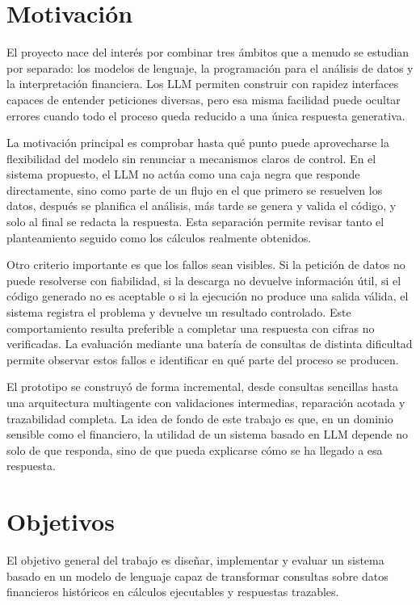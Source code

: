 \section{Motivaci\'on}

El proyecto nace del inter\'es por combinar tres \'ambitos que a menudo se estudian por separado: los modelos de lenguaje, la programaci\'on para el an\'alisis de datos y la
interpretaci\'on financiera. Los LLM permiten construir con rapidez interfaces capaces de entender peticiones diversas, pero esa misma facilidad puede ocultar errores
cuando todo el proceso queda reducido a una \'unica respuesta generativa.

La motivaci\'on principal es comprobar hasta qu\'e punto puede aprovecharse la flexibilidad del modelo sin renunciar a mecanismos claros de control. En el sistema propuesto,
el LLM no act\'ua como una caja negra que responde directamente, sino como parte de un flujo en el que primero se resuelven los datos, despu\'es se planifica el an\'alisis,
m\'as tarde se genera y valida el c\'odigo, y solo al final se redacta la respuesta. Esta separaci\'on permite revisar tanto el planteamiento seguido como los c\'alculos
realmente obtenidos.

Otro criterio importante es que los fallos sean visibles. Si la petici\'on de datos no puede resolverse con fiabilidad, si la descarga no devuelve informaci\'on \'util, si
el c\'odigo generado no es aceptable o si la ejecuci\'on no produce una salida v\'alida, el sistema registra el problema y devuelve un resultado controlado. Este
comportamiento resulta preferible a completar una respuesta con cifras no verificadas. La evaluaci\'on mediante una bater\'ia de consultas de distinta dificultad permite
observar estos fallos e identificar en qu\'e parte del proceso se producen.

El prototipo se construy\'o de forma incremental, desde consultas sencillas hasta una arquitectura multiagente con validaciones intermedias, reparaci\'on acotada y
trazabilidad completa. La idea de fondo de este trabajo es que, en un dominio sensible como el financiero, la utilidad de un sistema basado en LLM depende no solo de
que responda, sino de que pueda explicarse c\'omo se ha llegado a esa respuesta.

\section{Objetivos}

El objetivo general del trabajo es dise\~nar, implementar y evaluar un sistema basado en un modelo de lenguaje capaz de transformar consultas sobre datos financieros
hist\'oricos en c\'alculos ejecutables y respuestas trazables.

